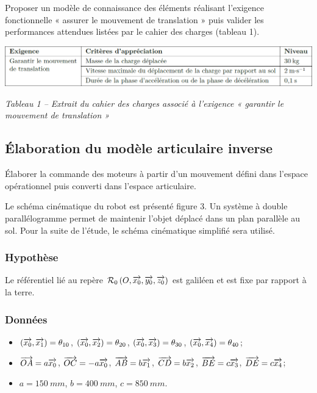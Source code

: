 \documentclass[10pt,fleqn]{article} %
\begin{document}
\begin{obj}
Proposer un modèle de connaissance des éléments réalisant l’exigence fonctionnelle « assurer le mouvement
de translation » puis valider les performances attendues listées par le cahier des charges (tableau
1).
\end{obj}

\ifprof
\else
\begin{center}
\includegraphics[width=\linewidth]{tab_01}

\textit{Tableau 1 -- Extrait du cahier des charges associé à l’exigence « garantir le mouvement de translation »}
\end{center}

\fi

\subsection{Élaboration du modèle articulaire inverse}
\begin{obj}
Élaborer la commande des moteurs à partir d’un mouvement défini dans l’espace opérationnel puis
converti dans l’espace articulaire.
\end{obj}
\ifprof
\else

Le schéma cinématique du robot est présenté figure 3. Un système à double parallélogramme permet de maintenir
l’objet déplacé dans un plan parallèle au sol. Pour la suite de l’étude, le schéma cinématique simplifié sera utilisé.

\subsubsection*{Hypothèse}
Le référentiel lié au repère $\mathcal{R}_{0}\left(O,\overrightarrow{x_0},\overrightarrow{y_0},\overrightarrow{z_0} \right)$ est galiléen et est fixe par rapport à la terre.
\subsubsection*{Données}
\begin{itemize}
\item $\left(\overrightarrow{x_0},\overrightarrow{x_1}\right)=\theta_{10}$, 
$\left(\overrightarrow{x_0},\overrightarrow{x_2}\right)=\theta_{20}$, 
$\left(\overrightarrow{x_0},\overrightarrow{x_3}\right)=\theta_{30}$, 
$\left(\overrightarrow{x_0},\overrightarrow{x_4}\right)=\theta_{40}$;
\item $\overrightarrow{OA}=a\overrightarrow{x_0}$, 
$\overrightarrow{OC}=-a\overrightarrow{x_0}$, 
$\overrightarrow{AB}=b\overrightarrow{x_1}$, 
$\overrightarrow{CD}=b\overrightarrow{x_2}$, 
$\overrightarrow{BE}=c\overrightarrow{x_3}$, 
$\overrightarrow{DE}=c\overrightarrow{x_4}$;
\item $a=\SI{150}{mm}$, $b=\SI{400}{mm}$, $c=\SI{850}{mm}$.
\end{itemize}
\end{document}
